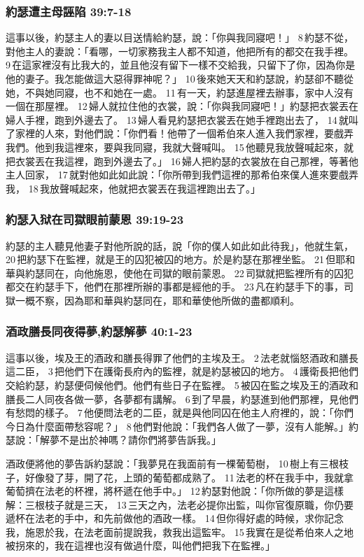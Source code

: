 \subsubsection{約瑟遭主母誣陷 39:7-18} 
這事以後，約瑟主人的妻以目送情給約瑟，說：「你與我同寢吧！」 8 約瑟不從，對他主人的妻說：「看哪，一切家務我主人都不知道，他把所有的都交在我手裡。 9 在這家裡沒有比我大的，並且他沒有留下一樣不交給我，只留下了你，因為你是他的妻子。我怎能做這大惡得罪神呢？」 10 後來她天天和約瑟說，約瑟卻不聽從她，不與她同寢，也不和她在一處。 11 有一天，約瑟進屋裡去辦事，家中人沒有一個在那屋裡。 12 婦人就拉住他的衣裳，說：「你與我同寢吧！」約瑟把衣裳丟在婦人手裡，跑到外邊去了。 13 婦人看見約瑟把衣裳丟在她手裡跑出去了， 14 就叫了家裡的人來，對他們說：「你們看！他帶了一個希伯來人進入我們家裡，要戲弄我們。他到我這裡來，要與我同寢，我就大聲喊叫。 15 他聽見我放聲喊起來，就把衣裳丟在我這裡，跑到外邊去了。」 16 婦人把約瑟的衣裳放在自己那裡，等著他主人回家， 17 就對他如此如此說：「你所帶到我們這裡的那希伯來僕人進來要戲弄我， 18 我放聲喊起來，他就把衣裳丟在我這裡跑出去了。」

\subsubsection{約瑟入狱在司獄眼前蒙恩 39:19-23} 
約瑟的主人聽見他妻子對他所說的話，說「你的僕人如此如此待我」，他就生氣， 20 把約瑟下在監裡，就是王的囚犯被囚的地方。於是約瑟在那裡坐監。 21 但耶和華與約瑟同在，向他施恩，使他在司獄的眼前蒙恩。 22 司獄就把監裡所有的囚犯都交在約瑟手下，他們在那裡所辦的事都是經他的手。 23 凡在約瑟手下的事，司獄一概不察，因為耶和華與約瑟同在，耶和華使他所做的盡都順利。

\subsubsection{酒政膳長同夜得夢,約瑟解夢 40:1-23} 
這事以後，埃及王的酒政和膳長得罪了他們的主埃及王。 2 法老就惱怒酒政和膳長這二臣， 3 把他們下在護衛長府內的監裡，就是約瑟被囚的地方。 4 護衛長把他們交給約瑟，約瑟便伺候他們。他們有些日子在監裡。 5 被囚在監之埃及王的酒政和膳長二人同夜各做一夢，各夢都有講解。 6 到了早晨，約瑟進到他們那裡，見他們有愁悶的樣子。 7 他便問法老的二臣，就是與他同囚在他主人府裡的，說：「你們今日為什麼面帶愁容呢？」 8 他們對他說：「我們各人做了一夢，沒有人能解。」約瑟說：「解夢不是出於神嗎？請你們將夢告訴我。」

酒政便將他的夢告訴約瑟說：「我夢見在我面前有一棵葡萄樹， 10 樹上有三根枝子，好像發了芽，開了花，上頭的葡萄都成熟了。 11 法老的杯在我手中，我就拿葡萄擠在法老的杯裡，將杯遞在他手中。」 12 約瑟對他說：「你所做的夢是這樣解：三根枝子就是三天， 13 三天之內，法老必提你出監，叫你官復原職，你仍要遞杯在法老的手中，和先前做他的酒政一樣。 14 但你得好處的時候，求你記念我，施恩於我，在法老面前提說我，救我出這監牢。 15 我實在是從希伯來人之地被拐來的，我在這裡也沒有做過什麼，叫他們把我下在監裡。」

